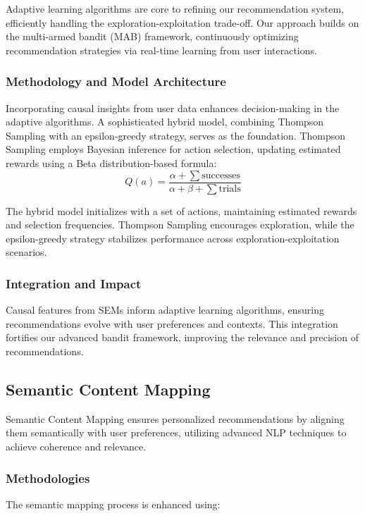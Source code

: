 Adaptive learning algorithms are core to refining our recommendation system, efficiently handling the exploration-exploitation trade-off. Our approach builds on the multi-armed bandit (MAB) framework, continuously optimizing recommendation strategies via real-time learning from user interactions.

\subsubsection{Methodology and Model Architecture}

Incorporating causal insights from user data enhances decision-making in the adaptive algorithms. A sophisticated hybrid model, combining Thompson Sampling with an epsilon-greedy strategy, serves as the foundation. Thompson Sampling employs Bayesian inference for action selection, updating estimated rewards using a Beta distribution-based formula:
\[
Q(a) = \frac{\alpha + \sum \text{successes}}{\alpha + \beta + \sum \text{trials}}
\]

The hybrid model initializes with a set of actions, maintaining estimated rewards and selection frequencies. Thompson Sampling encourages exploration, while the epsilon-greedy strategy stabilizes performance across exploration-exploitation scenarios.

\subsubsection{Integration and Impact}

Causal features from SEMs inform adaptive learning algorithms, ensuring recommendations evolve with user preferences and contexts. This integration fortifies our advanced bandit framework, improving the relevance and precision of recommendations.

\subsection{Semantic Content Mapping}

Semantic Content Mapping ensures personalized recommendations by aligning them semantically with user preferences, utilizing advanced NLP techniques to achieve coherence and relevance.

\subsubsection{Methodologies}

The semantic mapping process is enhanced using:

